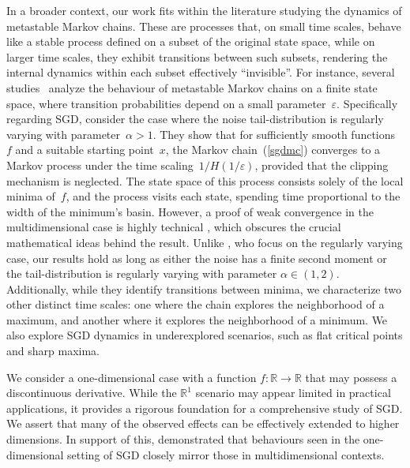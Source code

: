 \documentclass{article}
\theoremstyle{plain}
\theoremstyle{definition}
\theoremstyle{remark}
\begin{document}
In a broader context, our work fits within the literature studying the dynamics of metastable Markov chains. These are processes that, on small time scales, behave like a stable process defined on a subset of the original state space, while on larger time scales, they exhibit transitions between such subsets, rendering the internal dynamics within each subset effectively ``invisible''. For instance, several studies~\cite{betz2016multi, freidlin2017metastable} analyze the behaviour of metastable Markov chains on a finite state space, where transition probabilities depend on a small parameter~$\varepsilon$.
%
Specifically regarding SGD, \citet{wang2021eliminating} consider the case where the noise tail-distribution is regularly varying with parameter~$\alpha > 1$. They show that for sufficiently smooth functions~$f$ and a suitable starting point~$x$, the Markov chain~(\ref{sgdmc}) converges to a Markov process under the time scaling~$1/H(1/\varepsilon)$, provided that the clipping mechanism is neglected. The state space of this process consists solely of the local minima of~$f$, and the process visits each state, spending time proportional to the width of the minimum's basin.  However, a proof of weak convergence in the multidimensional case is highly technical \citep{wang2025global}, which obscures the crucial mathematical ideas behind the result. 
%
Unlike \citet{wang2021eliminating}, who focus on the regularly varying case, our results hold as long as either the noise has a finite second moment or the tail-distribution is regularly varying with parameter $\alpha \in (1, 2)$. Additionally, while they identify transitions between minima, we characterize two other distinct time scales: one where the chain explores the neighborhood of a maximum, and another where it explores the neighborhood of a minimum. We also explore SGD dynamics in underexplored scenarios, such as flat critical points and sharp maxima.


We consider a one-dimensional case with a function $f:\mathbb{R} \to \mathbb{R}$ that may possess a discontinuous derivative. While the $\mathbb{R}^1$ scenario may appear limited in practical applications, it provides a rigorous foundation for a comprehensive study of SGD. We assert that many of the observed effects can be effectively extended to higher dimensions. In support of this, \citet{wang2021eliminating} demonstrated that behaviours seen in the one-dimensional setting of SGD closely mirror those in multidimensional contexts. %
\end{document}
